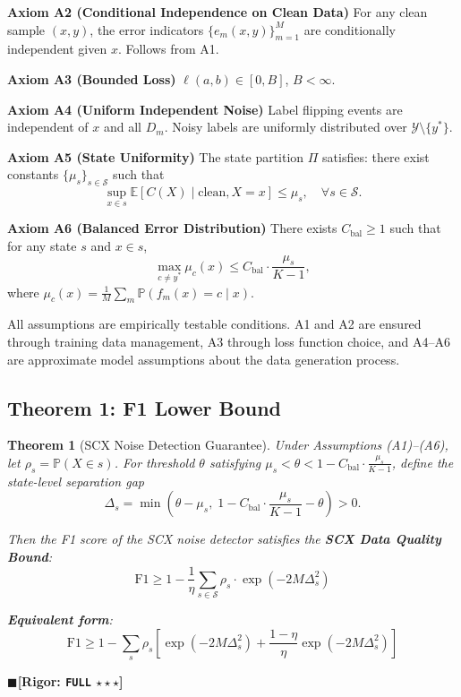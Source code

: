 \documentclass[12pt,a4paper]{article}
\newtheorem{theorem}{Theorem}[section]
\theoremstyle{definition}
\theoremstyle{remark}
\newcommand{\rigorFull}{$\blacksquare$\;\textbf{[Rigor: \texttt{FULL} $\star\star\star$]}}
\begin{document}
\textbf{Axiom A2 (Conditional Independence on Clean Data)} For any clean sample $(x, y)$, the error indicators $\{e_m(x,y)\}_{m=1}^M$ are conditionally independent given $x$. Follows from A1.

\textbf{Axiom A3 (Bounded Loss)} $\ell(a, b) \in [0, B]$, $B < \infty$.

\textbf{Axiom A4 (Uniform Independent Noise)} Label flipping events are independent of $x$ and all $D_m$. Noisy labels are uniformly distributed over $\mathcal{Y}\setminus\{y^*\}$.

\textbf{Axiom A5 (State Uniformity)} The state partition $\Pi$ satisfies: there exist constants $\{\mu_s\}_{s\in\mathcal{S}}$ such that
\begin{equation}
\sup_{x \in s} \mathbb{E}[C(X) \mid \text{clean}, X=x] \leq \mu_s, \quad \forall s \in \mathcal{S}.
\end{equation}

\textbf{Axiom A6 (Balanced Error Distribution)} There exists $C_{\text{bal}} \geq 1$ such that for any state $s$ and $x \in s$,
\begin{equation}
\max_{c \neq y^*} \mu_c(x) \leq C_{\text{bal}} \cdot \frac{\mu_s}{K-1},
\end{equation}
where $\mu_c(x) = \frac{1}{M}\sum_m \mathbb{P}(f_m(x) = c \mid x)$.

All assumptions are empirically testable conditions. A1 and A2 are ensured through training data management, A3 through loss function choice, and A4--A6 are approximate model assumptions about the data generation process.

\subsection{Theorem 1: F1 Lower Bound}

\begin{theorem}[SCX Noise Detection Guarantee]
\label{thm:1}
Under Assumptions (A1)--(A6), let $\rho_s = \mathbb{P}(X \in s)$. For threshold $\theta$ satisfying $\mu_s < \theta < 1 - C_{\text{bal}} \cdot \frac{\mu_s}{K-1}$, define the state-level separation gap
\begin{equation}
\Delta_s = \min\left(\theta - \mu_s, \; 1 - C_{\text{bal}} \cdot \frac{\mu_s}{K-1} - \theta\right) > 0.
\end{equation}

Then the F1 score of the SCX noise detector satisfies the \textbf{SCX Data Quality Bound}:
\begin{equation}
\boxed{\mathrm{F1} \geq 1 - \frac{1}{\eta}\sum_{s \in \mathcal{S}} \rho_s \cdot \exp(-2M\Delta_s^2)}
\end{equation}

\textbf{Equivalent form}:
\begin{equation}
\mathrm{F1} \geq 1 - \sum_{s} \rho_s \left[\exp(-2M\Delta_s^2) + \frac{1-\eta}{\eta}\exp(-2M\Delta_s^2)\right]
\end{equation}
\end{theorem}
\rigorFull
\end{document}
